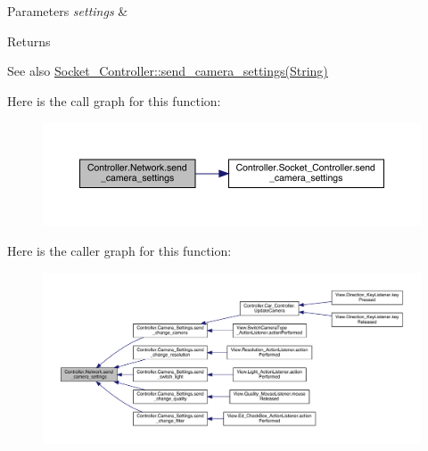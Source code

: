 \begin{DoxyParams}{Parameters}
{\em settings} & \\
\hline
\end{DoxyParams}
\begin{DoxyReturn}{Returns}

\end{DoxyReturn}
\begin{DoxySeeAlso}{See also}
\hyperlink{class_controller_1_1_socket___controller_a143d54b3c69a8f3ffd01c24c183cb186}{Socket\+\_\+\+Controller\+::send\+\_\+camera\+\_\+settings(\+String)} 
\end{DoxySeeAlso}


Here is the call graph for this function\+:
\nopagebreak
\begin{figure}[H]
\begin{center}
\leavevmode
\includegraphics[width=350pt]{class_controller_1_1_network_a880c5afa94e996a62e78f969dce79d1a_cgraph}
\end{center}
\end{figure}




Here is the caller graph for this function\+:
\nopagebreak
\begin{figure}[H]
\begin{center}
\leavevmode
\includegraphics[width=350pt]{class_controller_1_1_network_a880c5afa94e996a62e78f969dce79d1a_icgraph}
\end{center}
\end{figure}


\hypertarget{class_controller_1_1_network_a418b97d15f7ac480cdf77e24fcdc3ec1}{}

